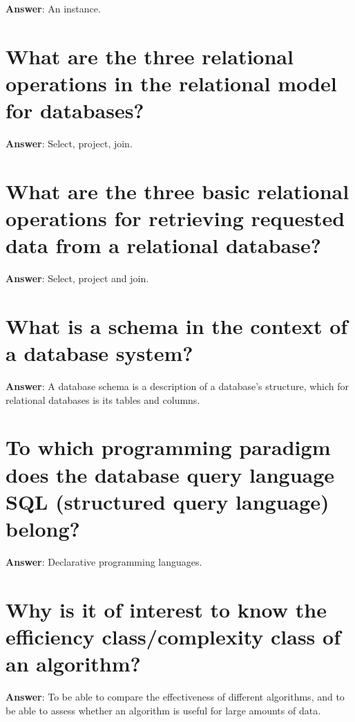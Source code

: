 \documentclass[a4paper,11pt,oneside]{book}
\begin{document}
\begin{sloppypar}
\label{q:295:sa:en:True}

\textbf{Answer}: An instance.



\section{What are the three relational operations in the relational model for databases?}

\label{q:296:sa:en:True}

\textbf{Answer}: Select, project, join.



\section{What are the three basic relational operations for retrieving requested data from a relational database?}

\label{q:297:sa:en:True}

\textbf{Answer}: Select, project and join.



\section{What is a schema in the context of a database system?}

\label{q:298:sa:en:True}

\textbf{Answer}: A database schema is a description of a database's structure, which for relational databases is its tables and columns.



\section{To which programming paradigm does the database query language SQL (structured query language) belong?}

\label{q:299:sa:en:True}

\textbf{Answer}: Declarative programming languages.



\section{Why is it of interest to know the efficiency class/complexity class of an algorithm?}

\label{q:300:sa:en:True}

\textbf{Answer}: To be able to compare the effectiveness of different algorithms, and to be able to assess whether an algorithm is useful for large amounts of data.




\end{sloppypar}
\end{document}
